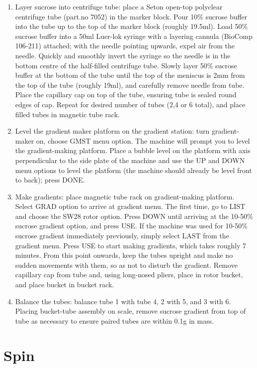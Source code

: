 \documentclass{article}
\begin{document}
\begin{enumerate}
  \item Layer sucrose into centrifuge tube: place a Seton open-top polyclear centrifuge tube  (part.no 7052) in the marker block. Pour 10\% sucrose buffer into the tube up to the top of the marker block (roughly 19.5ml). Load 50\% sucrose buffer into a 50ml Luer-lok syringe with a layering cannula (BioComp 106-211) attached; with the needle pointing upwards, expel air from the needle. Quickly and smoothly invert the syringe so the needle is in the bottom centre of the half-filled centrifuge tube. Slowly layer 50\% sucrose buffer at the bottom of the tube until the top of the meniscus is 2mm from the top of the tube (roughly 19ml), and carefully remove needle from tube. Place the capillary cap on top of the tube, ensuring tube is sealed round edges of cap. Repeat for desired number of tubes (2,4 or 6 total), and place filled tubes in magnetic tube rack.
  \item Level the gradient maker platform on the gradient station: turn gradient-maker on, choose GMST menu option. The machine will prompt you to level the gradient-making platform. Place a bubble level on the platform with axis perpendicular to the side plate of the machine and use the UP and DOWN menu options to level the platform (the machine should already be level front to back); press DONE.
  \item Make gradients: place magnetic tube rack on gradient-making platform. Select GRAD option to arrive at gradient menu. The first time, go to LIST and choose the SW28 rotor option. Press DOWN until arriving at the 10-50\% sucrose gradient option, and press USE. If the machine was used for 10-50\% sucrose gradient immediately previously, simply select LAST from the gradient menu. Press USE to start making gradients, which takes roughly 7 minutes. From this point onwards, keep the tubes upright and make no sudden movements with them, so as not to disturb the gradient. Remove capillary cap from tube and, using long-nosed pliers, place in rotor bucket, and place bucket in bucket rack.   
  \item Balance the tubes: balance tube 1 with tube 4, 2 with 5, and 3 with 6. Placing bucket-tube assembly on scale, remove sucrose gradient from top of tube as necessary to ensure paired tubes are within 0.1g in mass. 
  \end{enumerate}


\section{Spin}
\end{document}
